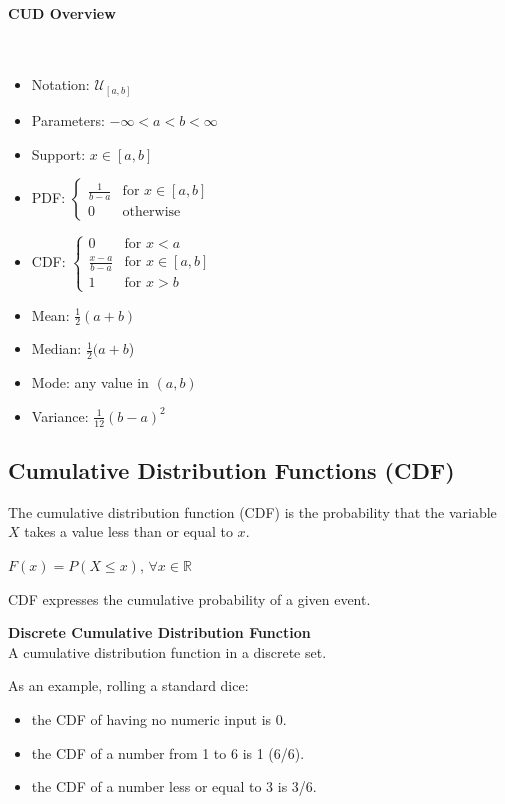 \documentclass{article}
\begin{document}
\paragraph{CUD Overview}\mbox{} \\

\begin{itemize}
    \item Notation: $\displaystyle {\mathcal {U}}_{[a,b]}$
    \item Parameters: $\displaystyle -\infty <a<b<\infty$
    \item Support: $\displaystyle x\in [a,b]$
    \item PDF: $\displaystyle {\begin{cases}{\frac {1}{b-a}}&{\text{for }}x\in [a,b]\\0&{\text{otherwise}}\end{cases}}$
    \item CDF: $\displaystyle {\begin{cases}0&{\text{for }}x<a\\{\frac {x-a}{b-a}}&{\text{for }}x\in [a,b]\\1&{\text{for }}x>b\end{cases}}$
    \item Mean: $\displaystyle {\tfrac {1}{2}}(a+b)$
    \item Median:	$\displaystyle {\tfrac {1}{2}}(a+b$)
    \item Mode:	any value in $\displaystyle (a,b)$
    \item Variance:	$\displaystyle {\tfrac {1}{12}}(b-a)^{2}$
\end{itemize}

\subsection{Cumulative Distribution Functions (CDF)}
The cumulative distribution function (CDF) is the probability that the variable $X$ takes a value less than or equal to $x$. 

$F(x) = P(X \leq x)$, $\forall x \in \mathbb{R}$  

CDF expresses the cumulative probability of a given event.

\textbf{Discrete Cumulative Distribution Function} \\
A cumulative distribution function in a discrete set.

As an example, rolling a standard dice:
\begin{itemize}
    \item the CDF of having no numeric input is 0.
    \item the CDF of a number from 1 to 6 is 1 (6/6).
    \item the CDF of a number less or equal to 3 is 3/6.
\end{itemize}
\end{document}
